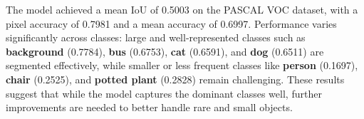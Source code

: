 The model achieved a mean IoU of 0.5003 on the PASCAL VOC dataset, with a pixel accuracy of 0.7981 and a mean accuracy of 0.6997. Performance varies significantly across classes: large and well-represented classes such as \textbf{background} (0.7784), \textbf{bus} (0.6753), \textbf{cat} (0.6591), and \textbf{dog} (0.6511) are segmented effectively, while smaller or less frequent classes like \textbf{person} (0.1697), \textbf{chair} (0.2525), and \textbf{potted plant} (0.2828) remain challenging. These results suggest that while the model captures the dominant classes well, further improvements are needed to better handle rare and small objects.